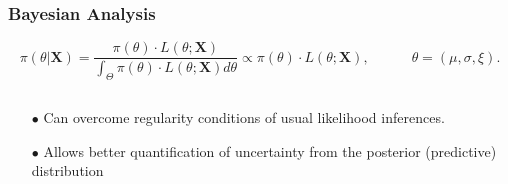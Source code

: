 \documentclass[9pt,xcolor={dvipsnames}]{beamer}
\begin{document}
\begin{frame}\frametitle{Bayesian Analysis}
	\vspace{-.45cm} 
\begin{equation*}
\boxed{\pi (\theta|\boldsymbol{X})=\frac{\pi(\theta)\cdot L(\theta;\boldsymbol{X})}{\int_{\Theta} 
	\pi(\theta)\cdot L(\theta;\boldsymbol{X}) d\theta}\propto \pi(\theta)\cdot 
L(\theta;\boldsymbol{X}), \quad\qquad \theta=(\mu,\sigma,\xi).}
\end{equation*}
	\vspace{.05cm}
\begin{columns}[T]
	\begin{column}{.7\textwidth}
		
\begin{itemize}
	\item[$\bullet$] Can overcome regularity conditions of usual likelihood inferences. 
	\item[$\bullet$] Allows better quantification of uncertainty from the posterior (predictive) distribution
\end{itemize}


\end{column}
\end{columns}
\end{frame}
\end{document}
